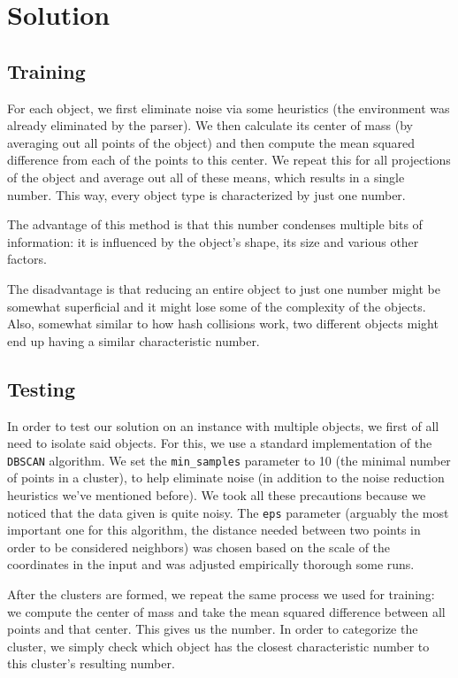 \documentclass{article}
\begin{document}
	\section{Solution}
	
	\subsection{Training}
	
	For each object, we first eliminate noise via some heuristics (the environment was already eliminated by the parser). We then calculate its center of mass (by averaging out all points of the object) and then compute the mean squared difference from each of the points to this center. We repeat this for all projections of the object and average out all of these means, which results in a single number. This way, every object type is characterized by just one number.
	
	The advantage of this method is that this number condenses multiple bits of information: it is influenced by the object's shape, its size and various other factors.
	
	The disadvantage is that reducing an entire object to just one number might be somewhat superficial and it might lose some of the complexity of the objects. Also, somewhat similar to how hash collisions work, two different objects might end up having a similar characteristic number.

	\subsection{Testing}
	
	In order to test our solution on an instance with multiple objects, we first of all need to isolate said objects. For this, we use a standard implementation of the \texttt{DBSCAN} algorithm. We set the \texttt{min\_samples} parameter to 10 (the minimal number of points in a cluster), to help eliminate noise (in addition to the noise reduction heuristics we've mentioned before). We took all these precautions because we noticed that the data given is quite noisy. The \texttt{eps} parameter (arguably the most important one for this algorithm, the distance needed between two points in order to be considered neighbors) was chosen based on the scale of the coordinates in the input and was adjusted empirically thorough some runs.
	
	After the clusters are formed, we repeat the same process we used for training: we compute the center of mass and take the mean squared difference between all points and that center. This gives us the number. In order to categorize the cluster, we simply check which object has the closest characteristic number to this cluster's resulting number.
	
\end{document}
